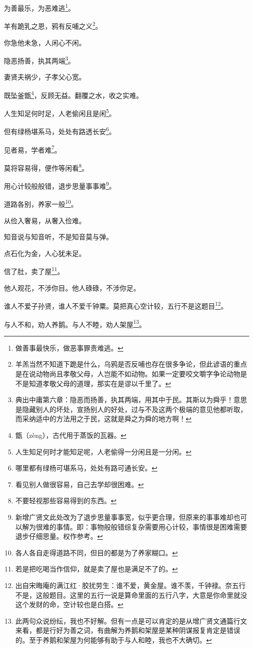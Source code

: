 \documentclass[12pt,oneside]{book}
\begin{document}
为善最乐，为恶难逃\footnote{做善事最快乐，做恶事罪责难逃。}。

羊有跪乳之恩，鸦有反哺之义\footnote{羊羔当然不知道下跪是什么，乌鸦是否反哺也存在很多争论，但此谚语的重点是在说动物尚且孝敬父母，人岂能不如动物。如果一定要咬文嚼字争论动物是不是知道孝敬父母的道理，那实在是谬以千里了。}。

你急他未急，人闲心不闲。

隐恶扬善，执其两端\footnote{典出中庸第六章：隐恶而扬善，执其两端，用其中于民。其斯以为舜乎！意思是隐藏别人的坏处，宣扬别人的好处，过与不及这两个极端的意见他都听取，而采纳适中的方法用之于民，这就是舜之为舜的地方啊！}。

妻贤夫祸少，子孝父心宽。

既坠釜甑\footnote{甑（zèng），古代用于蒸饭的瓦器。}，反顾无益。翻覆之水，收之实难。

人生知足何时足，人老偷闲且是闲\footnote{人生知足何时才能知足呢，人老偷得一分闲且是一分闲。}。

但有绿杨堪系马，处处有路透长安\footnote{哪里都有绿杨可堪系马，处处有路可通长安。}。

见者易，学者难\footnote{看见别人做很容易，自己去学却很困难。}。

莫将容易得，便作等闲看\footnote{不要轻视那些容易得到的东西。}。

用心计较般般错，退步思量事事难\footnote{新增广贤文此处改为了退步思量事事宽，似乎更合理，但原来的事事难却也可以解为很难的事情。即：事物般般错综复杂需要用心计较，事情很是困难需要退步仔细思量。权作参考。}。

道路各别，养家一般\footnote{各人各自走得道路不同，但目的都是为了养家糊口。}。

从俭入奢易，从奢入俭难。

知音说与知音听，不是知音莫与弹。

点石化为金，人心犹未足。

信了肚，卖了屋\footnote{若是把吃喝当作信仰，就是卖了屋也是满足不了的。}。

他人观花，不涉你目。他人碌碌，不涉你足。

谁人不爱子孙贤，谁人不爱千钟粟。莫把真心空计较，五行不是这题目\footnote{出自宋晦庵的满江红·胶扰劳生：谁不爱，黄金屋。谁不羡，千钟禄。奈五行不是，这般题目。这里的五行一说是算命里面的五行八字，大意是你命里就没这个发财的命，空计较也是白搭。}。

与人不和，劝人养鹅。与人不睦，劝人架屋\footnote{此两句众说纷纭，我也不好解。但有一点是可以肯定的是从增广贤文通篇行文来看，都是行好为善之词，有曲解为养鹅和架屋是某种阴谋报复肯定是错误的。至于养鹅和架屋为何能够有助于与人和睦，我也不大确切。}。
\end{document}
